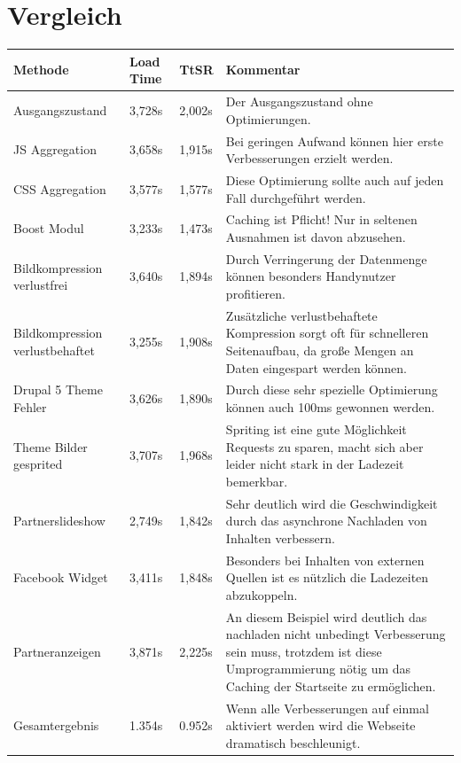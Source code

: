 \section{Vergleich}
\begin{center}
    \begin{tabular}{ | p{4cm} | p{1cm} | p{1cm} | p{6cm} |}
    \hline
    Methode & Load Time & TtSR & Kommentar \\ \hline
    \hline
    Ausgangszustand 	& 3,728s  & 2,002s & Der Ausgangszustand ohne Optimierungen. \\ \hline
    JS Aggregation 	& 3,658s  & 1,915s & Bei geringen Aufwand können hier erste Verbesserungen erzielt werden. \\ \hline
    CSS Aggregation 	& 3,577s  & 1,577s & Diese Optimierung sollte auch auf jeden Fall durchgeführt werden. \\ \hline
    Boost Modul 	& 3,233s  & 1,473s & Caching ist Pflicht! Nur in seltenen Ausnahmen ist davon abzusehen. \\ \hline
    Bildkompression verlustfrei 	& 3,640s  & 1,894s & Durch Verringerung der Datenmenge können besonders Handynutzer profitieren.  \\ \hline
    Bildkompression verlustbehaftet 	& 3,255s  & 1,908s & Zusätzliche verlustbehaftete Kompression sorgt oft für schnelleren Seitenaufbau, da große Mengen an Daten eingespart werden können.  \\ \hline
    Drupal 5 Theme Fehler 	& 3,626s  & 1,890s & Durch diese sehr spezielle Optimierung können auch 100ms gewonnen werden.  \\ \hline
    Theme Bilder gesprited 	& 3,707s  & 1,968s & Spriting ist eine gute Möglichkeit Requests zu sparen, macht sich aber leider nicht stark in der Ladezeit bemerkbar.  \\ \hline
    Partnerslideshow 	& 2,749s  & 1,842s & Sehr deutlich wird die Geschwindigkeit durch das asynchrone Nachladen von Inhalten verbessern.  \\ \hline
    Facebook Widget 	& 3,411s  & 1,848s & Besonders bei Inhalten von externen Quellen ist es nützlich die Ladezeiten abzukoppeln.  \\ \hline
    Partneranzeigen 	& 3,871s  & 2,225s & An diesem Beispiel wird deutlich das nachladen nicht unbedingt Verbesserung sein muss, trotzdem ist diese Umprogrammierung nötig um das Caching der Startseite zu ermöglichen.  \\ \hline
    \hline
    Gesamtergebnis 	& 1.354s  & 0.952s & Wenn alle Verbesserungen auf einmal aktiviert werden wird die Webseite dramatisch beschleunigt.  \\ \hline
    
    \hline
    \end{tabular}
\end{center}